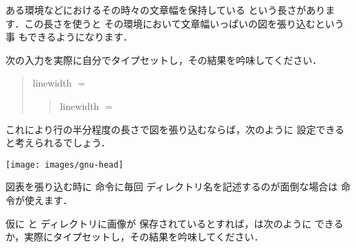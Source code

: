 \begin{Prob}
ある環境などにおけるその時々の文章幅を保持している 
という長さがあります．この長さを使うと
その環境において文章幅いっぱいの図を張り込むという事
もできるようになります．

 次の入力を実際に自分でタイプセットし，その結果を吟味してください．
\begin{inout}
\begin{quote}
  linewidth $=$ \the\linewidth\par
  \begin{quote}
    linewidth $=$ \the\linewidth
  \end{quote}
\end{quote}
\end{inout}

これにより行の半分程度の長さで図を張り込むならば，次のように
設定できると考えられるでしょう．

\begin{intext}
\texttt{[image: images/gnu-head]}\\ 
\end{intext}
\end{Prob}

\begin{Prob}
図表を張り込む時に 命令に毎回
ディレクトリ名を記述するのが面倒な場合は 
命令が使えます．


仮に  と  ディレクトリに画像が
保存されているとすれば，は次のように
できるか，実際にタイプセットし，その結果を吟味してください．

\begin{intext}
\graphicspath{{images/}{geolay/}}
\end{intext}
\end{Prob} 

